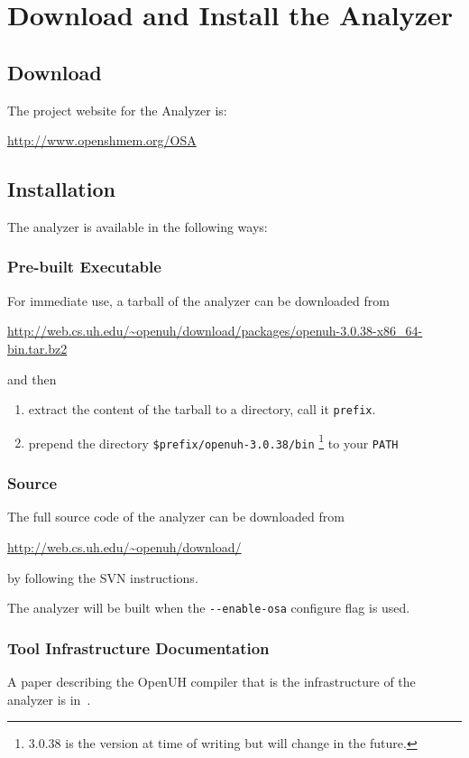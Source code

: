 \section{Download and Install the \openshmem Analyzer}

\subsection{Download}

The project website for the \openshmem Analyzer is:

\begin{center}
{\small \url{http://www.openshmem.org/OSA}}
\end{center}

\subsection{Installation}


The \openshmem analyzer is available in the following ways:

\subsubsection{Pre-built Executable}

For immediate use, a tarball of the \openshmem analyzer can be
downloaded from
\begin{center}
{\small \url{http://web.cs.uh.edu/~openuh/download/packages/openuh-3.0.38-x86_64-bin.tar.bz2}}
\end{center}

and then

\begin{enumerate}
\item extract the content of the tarball to a directory, call it
  \texttt{prefix}.
\item prepend the directory \texttt{\$prefix/openuh-3.0.38/bin}
  \footnote{3.0.38 is the version at time of writing but will change
    in the future.} to your \texttt{PATH}
\end{enumerate}


\subsubsection{Source}

The full source code of the \openshmem analyzer can be downloaded from
\begin{center}
{\small \url{http://web.cs.uh.edu/~openuh/download/}}
\end{center}
by following the SVN instructions.

The \openshmem analyzer will be built when the
\texttt{-{}-{}enable-osa} configure flag is used.

\subsubsection{Tool Infrastructure Documentation}

A paper describing the OpenUH compiler that is the infrastructure of
the \openshmem analyzer is in~\cite{chapman2012experiencesspringer}.
